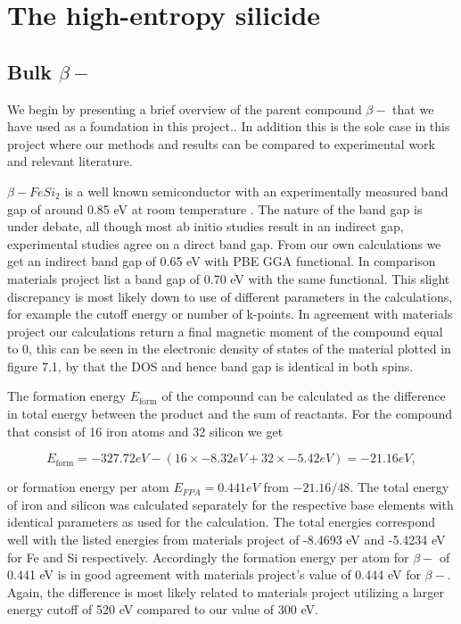 \chapter{The high-entropy silicide }
\label{sec:equi}

\section{Bulk $\beta-$ }
We begin by presenting a brief overview of the parent compound $\beta-$ that we have used as a foundation in this project.. In addition this is the sole case in this project where our methods and results can be compared to experimental work and relevant literature.

$\beta-FeSi_2$ is a well known semiconductor with an experimentally measured band gap of around 0.85 eV at room temperature \cite{PhysRevB.58.10389}. The nature of the band gap is under debate, all though most ab initio studies result in an indirect gap, experimental studies agree on a direct band gap. From our own calculations we get an indirect band gap of 0.65 eV with PBE GGA functional. In comparison materials project list a band gap of 0.70 eV with the same functional. This slight discrepancy is most likely down to use of different parameters in the calculations, for example the cutoff energy or number of k-points. In agreement with materials project our calculations return a final magnetic moment of the compound equal to 0, this can be seen in the electronic density of states of the material plotted in figure 7.1, by that the DOS and hence band gap is identical in both spins.   

The formation energy $E_\text{form}$ of the compound can be calculated as the difference in total energy between the product and the sum of reactants. For the  compound that consist of 16 iron atoms and 32 silicon we get 

\begin{equation*}
E_\text{form} = -327.72 eV - (16 \times -8.32 eV + 32 \times -5.42 eV) = -21.16 eV, 
\end{equation*}

or formation energy per atom $E_{FPA} = 0.441 eV$ from $-21.16/48$. The total energy of iron and silicon was calculated separately for the respective base elements with identical parameters as used for the  calculation. The total energies correspond well with the listed energies from materials project of -8.4693 eV and -5.4234 eV for Fe and Si respectively. Accordingly the formation energy per atom for $\beta-$  of 0.441 eV is in good agreement with materials project's value of 0.444 eV for $\beta-$. Again, the difference is most likely related to materials project utilizing a larger energy cutoff of 520 eV compared to our value of 300 eV.

